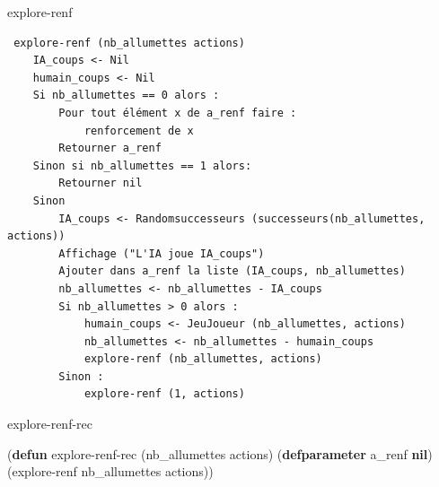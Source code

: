 \documentclass[
]{article}
\newenvironment{Shaded}{}{}
\newcommand{\FunctionTok}[1]{\textcolor[rgb]{0.02,0.16,0.49}{#1}}
\newcommand{\KeywordTok}[1]{\textcolor[rgb]{0.00,0.44,0.13}{\textbf{#1}}}
\newcommand{\NormalTok}[1]{#1}
\begin{document}
\begin{algorithm}[H]
    \caption{explore-renf}
\begin{verbatim}
 explore-renf (nb_allumettes actions)
    IA_coups <- Nil
    humain_coups <- Nil
    Si nb_allumettes == 0 alors :
        Pour tout élément x de a_renf faire :
            renforcement de x
        Retourner a_renf
    Sinon si nb_allumettes == 1 alors:
        Retourner nil
    Sinon
        IA_coups <- Randomsuccesseurs (successeurs(nb_allumettes, actions))
        Affichage ("L'IA joue IA_coups")
        Ajouter dans a_renf la liste (IA_coups, nb_allumettes)
        nb_allumettes <- nb_allumettes - IA_coups
        Si nb_allumettes > 0 alors :
            humain_coups <- JeuJoueur (nb_allumettes, actions)
            nb_allumettes <- nb_allumettes - humain_coups
            explore-renf (nb_allumettes, actions)
        Sinon :
            explore-renf (1, actions)
\end{verbatim}
\end{algorithm}

\begin{Shaded}
    \begin{algorithm}[H]
    \caption{explore-renf-rec}
\begin{Highlighting}[]
\NormalTok{(}\KeywordTok{defun}\FunctionTok{ explore{-}renf{-}rec }\NormalTok{(nb\_allumettes actions)}
\NormalTok{  (}\KeywordTok{defparameter}\FunctionTok{ a}\NormalTok{\_renf }\KeywordTok{nil}\NormalTok{)}
\NormalTok{    (explore{-}renf nb\_allumettes actions))}
\end{Highlighting}
\end{algorithm}
\end{Shaded}
\end{document}
